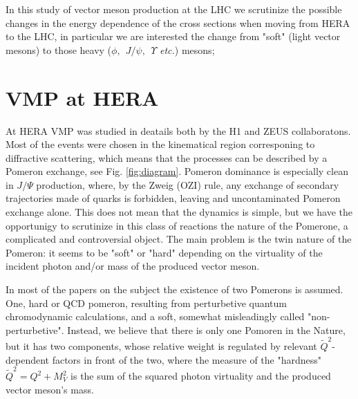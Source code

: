 \documentclass[12pt]{article}
\begin{document}
In this study of vector meson production at the LHC we scrutinize the possible changes in the energy dependence of the cross sections when moving from HERA to the LHC, in particular we are interested the change from "soft" (light vector mesons) to those heavy ($\phi,\ \ J/\psi,\ \ \Upsilon$ {\it etc.}) mesons;

\section{VMP at HERA}
At HERA VMP was studied in deatails both by the H1 and ZEUS collaboratons. Most of the events were chosen in the 
kinematical region corresponing to diffractive scattering, which means that the processes can be described by a Pomeron exchange, see Fig. \ref{fig:diagram}. Pomeron dominance is especially clean in $J/\Psi$ production, where,
by the Zweig (OZI) rule, any exchange of secondary trajectories made of quarks is forbidden, leaving and uncontaminated Pomeron exchange alone.  This does not mean that the dynamics is simple, but we have the opportunigy 
to scrutinize in this class of reactions the nature of the Pomerone, a complicated and controversial object. 
The main problem is the twin nature of the Pomeron: it seems to be "soft" or "hard" depending on the virtuality of the incident photon and/or mass of the produced vector meson.   
     

In most of the papers on the subject the existence of two Pomerons is assumed. One, hard or QCD pomeron, resulting
from perturbetive quantum chromodynamic calculations, and a soft, somewhat misleadingly called "non-perturbetive". 
Instead, we believe that there is only one Pomoren in the Nature, but it has two components, whose relative weight is 
regulated by relevant $\tilde Q^2$-dependent factors in front of the two, where the measure of the "hardness" $\tilde Q^2=Q^2+M_V^2$ is the sum of the squared photon virtuality and the produced vector meson's mass.  
\end{document}
